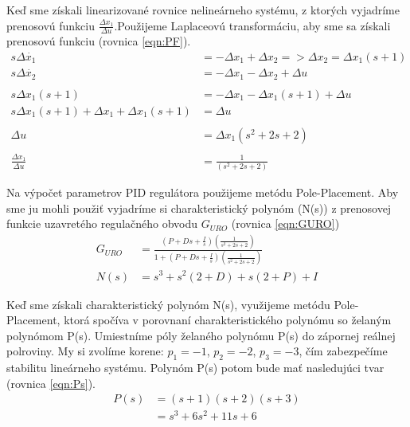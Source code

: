 \documentclass[../main.tex]{subfiles}
\begin{document}
Keď sme získali linearizované rovnice nelineárneho systému, z ktorých vyjadríme prenosovú funkciu $\frac{\Delta x_1}{\Delta u}$.Použijeme Laplaceovú transformáciu, aby sme sa získali prenosovú funkciu (rovnica \ref{eqn:PF}).
\begin{equation}
\begin{aligned} 
s\Delta \dot{x_1}  &= -\Delta x_1 + \Delta x_2 => \Delta x_2 = \Delta x_1(s+1) \\
s\Delta \dot{x_2} & = -\Delta x_1 - \Delta x_2 + \Delta u \\\\
s\Delta x_1(s+1) & = -\Delta x_1 - \Delta x_1(s+1) + \Delta u\\
s\Delta x_1(s+1) + \Delta x_1 + \Delta x_1(s+1) & = \Delta u\\\\
\Delta u & = \Delta x_1(s^2+2s+2)\\\\
\frac{\Delta x_1}{\Delta u} & = \frac{1}{(s^2+2s+2)}\
 \end{aligned}
 \label{eqn:PF}
\end{equation}	

Na výpočet parametrov PID regulátora použijeme metódu Pole-Placement. Aby sme ju mohli použiť vyjadríme si charakteristický polynóm (N(s)) z prenosovej funkcie uzavretého regulačného obvodu ${G_{URO}}$ (rovnica \ref{eqn:GURO})
\begin{equation}
	\begin{aligned}
	G_{URO} &= \frac{(P+Ds+\frac{I}{s})(\frac{1}{s^2+2s+2})}{1+(P+Ds+\frac{I}{s})(\frac{1}{s^2+2s+2})}  \\
		N(s)	&= s^3+s^2(2+D)+s(2+P)+I
	\end{aligned}
	\label{eqn:GURO}
\end{equation}

Keď sme získali charakteristický polynóm N(s), využijeme  metódu Pole-Placement, ktorá spočíva v porovnaní charakteristického polynómu so želaným polynómom P(s). Umiestníme póly želaného polynómu P(s) do zápornej reálnej polroviny. My si zvolíme korene: $p_1 = -1$, $p_2 = -2$, $p_3 = -3$, čím zabezpečíme stabilitu lineárneho systému. Polynóm P(s) potom bude mať nasledujúci tvar (rovnica \ref{eqn:Ps}). 
\begin{equation}
	\begin{aligned}
	P(s) &= (s + 1)(s + 2)(s + 3) \\
		 &= s^3 + 6s^2 + 11s + 6 \\
	\end{aligned}
\label{eqn:Ps}
\end{equation}
\end{document}
